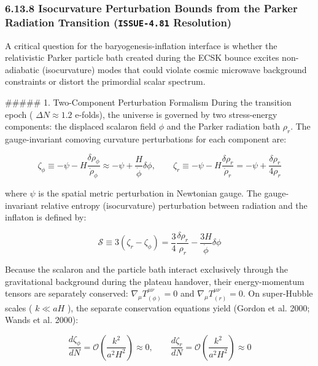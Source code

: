 \documentclass[11pt,a4paper]{article}
\theoremstyle{definition}
\theoremstyle{remark}
\begin{document}
\subsubsection{6.13.8 Isocurvature Perturbation Bounds from the Parker Radiation Transition (\texttt{ISSUE-4.81} Resolution)}

A critical question for the baryogenesis-inflation interface is whether the relativistic Parker particle bath created during the ECSK bounce excites non-adiabatic (isocurvature) modes that could violate cosmic microwave background constraints or distort the primordial scalar spectrum.

\#\#\#\#\# 1. Two-Component Perturbation Formalism
During the transition epoch ( $\Delta N \approx 1.2$ e-folds), the universe is governed by two stress-energy components: the displaced scalaron field $\phi$ and the Parker radiation bath $\rho_r$. The gauge-invariant comoving curvature perturbations for each component are:


\begin{equation}
\zeta_\phi \equiv -\psi - H \frac{\delta\rho_\phi}{\dot{\rho}_\phi} \approx -\psi + \frac{H}{\dot{\phi}} \delta\phi, \qquad \zeta_r \equiv -\psi - H \frac{\delta\rho_r}{\dot{\rho}_r} = -\psi + \frac{\delta\rho_r}{4\rho_r}
\end{equation}


where $\psi$ is the spatial metric perturbation in Newtonian gauge. The gauge-invariant relative entropy (isocurvature) perturbation between radiation and the inflaton is defined by:


\begin{equation}
\mathcal{S} \equiv 3(\zeta_r - \zeta_\phi) = \frac{3}{4} \frac{\delta\rho_r}{\rho_r} - \frac{3 H}{\dot{\phi}} \delta\phi
\end{equation}


Because the scalaron and the particle bath interact exclusively through the gravitational background during the plateau handover, their energy-momentum tensors are separately conserved: $\nabla_\mu T^{\mu\nu}_{(\phi)} = 0$ and $\nabla_\mu T^{\mu\nu}_{(r)} = 0$. On super-Hubble scales ( $k \ll aH$ ), the separate conservation equations yield (Gordon et al. 2000; Wands et al. 2000):


\begin{equation}
\frac{d\zeta_\phi}{dN} = \mathcal{O}\left(\frac{k^2}{a^2 H^2}\right) \approx 0, \qquad \frac{d\zeta_r}{dN} = \mathcal{O}\left(\frac{k^2}{a^2 H^2}\right) \approx 0
\end{equation}
\end{document}
